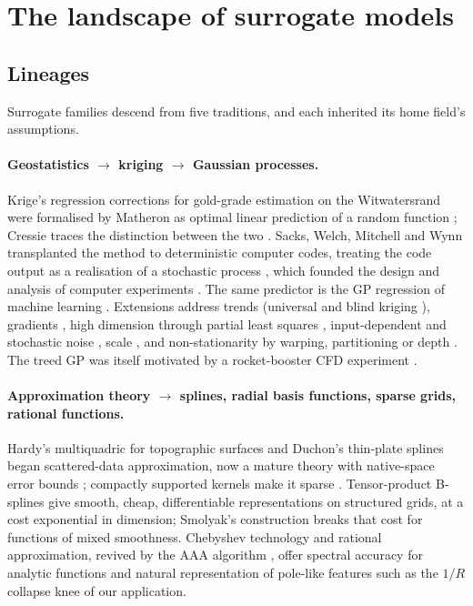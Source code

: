 \section{The landscape of surrogate models}
\label{sec:landscape}

\subsection{Lineages}
Surrogate families descend from five traditions, and each inherited its home field's assumptions.

\paragraph{Geostatistics $\rightarrow$ kriging $\rightarrow$ Gaussian processes.}
Krige's regression corrections for gold-grade estimation on the Witwatersrand \cite{krige1951statistical} were
formalised by Matheron as optimal linear prediction of a random function \cite{matheron1963principles}; Cressie traces
the distinction between the two \cite{cressie1990origins}. Sacks, Welch, Mitchell and Wynn transplanted the method to
deterministic computer codes, treating the code output as a realisation of a stochastic process
\cite{sacks1989design}, which founded the design and analysis of computer experiments
\cite{santner2003design,kleijnen2015design,gramacy2020surrogates}. The same predictor is the GP regression of machine
learning \cite{rasmussen2006gaussian}. Extensions address trends (universal and blind kriging \cite{joseph2008blind}),
gradients \cite{morris1993bayesian}, high dimension through partial least squares \cite{bouhlel2016improving},
input-dependent and stochastic noise \cite{goldberg1998regression,ankenman2010stochastic}, scale
\cite{titsias2009variational,gramacy2015local}, and non-stationarity by warping, partitioning or depth
\cite{snoek2014input,gramacy2008bayesian,damianou2013deep}. The treed GP was itself motivated by a rocket-booster CFD
experiment \cite{gramacy2008bayesian}.

\paragraph{Approximation theory $\rightarrow$ splines, radial basis functions, sparse grids, rational functions.}
Hardy's multiquadric for topographic surfaces \cite{hardy1971multiquadric} and Duchon's thin-plate splines
\cite{duchon1977splines} began scattered-data approximation, now a mature theory with native-space error bounds
\cite{wendland2004scattered,schaback1995error,fasshauer2007meshfree}; compactly supported kernels make it sparse
\cite{wendland1995piecewise}. Tensor-product B-splines \cite{deboor2001practical} give smooth, cheap, differentiable
representations on structured grids, at a cost exponential in dimension; Smolyak's construction
\cite{smolyak1963quadrature,bungartz2004sparse} breaks that cost for functions of mixed smoothness. Chebyshev
technology \cite{trefethen2013approximation} and rational approximation, revived by the AAA algorithm
\cite{nakatsukasa2018aaa}, offer spectral accuracy for analytic functions and natural representation of pole-like
features such as the $1/R$ collapse knee of our application.

